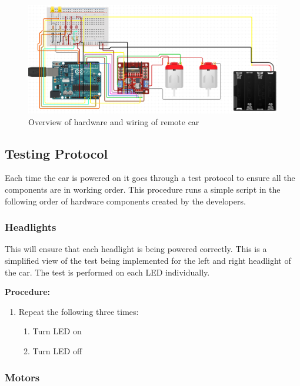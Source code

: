 \documentclass[letterpaper,12pt]{report}
\begin{document}
    \begin{figure}[H]
        \centering
        \includegraphics[width=\linewidth]{diagrams/Design_Hardware_Schematic.png}
        \caption{Overview of hardware and wiring of remote car}
        \label{fig:hardware}
    \end{figure}

    \subsection{Testing Protocol}

    Each time the car is powered on it goes through a test protocol to ensure
    all the components are in working order. This procedure runs a simple script
    in the following order of hardware components created by the developers.

    \subsubsection{Headlights}

    This will ensure that each headlight is being powered correctly. This is a
    simplified view of the test being implemented for the left and right
    headlight of the car. The test is performed on each LED individually.

    \textbf{Procedure:}
    \begin{enumerate}
        \item Repeat the following three times:
            \begin{enumerate}
                \item Turn LED on
                \item Turn LED off
            \end{enumerate}
    \end{enumerate}

    \subsubsection{Motors}
\end{document}
